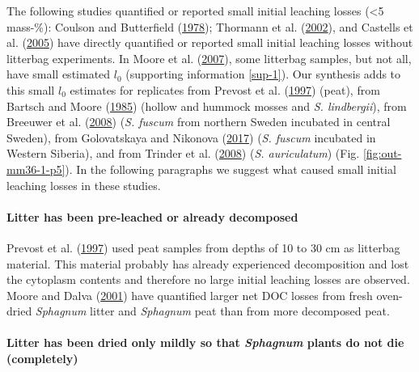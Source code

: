\documentclass[
  12pt,
]{article}
\begin{document}
The following studies quantified or reported small initial leaching losses (\textless5 mass-\%): Coulson and Butterfield (\protect\hyperlink{ref-Coulson.1978}{1978}); Thormann et al. (\protect\hyperlink{ref-Thormann.2002}{2002}), and Castells et al. (\protect\hyperlink{ref-Castells.2005}{2005}) have directly quantified or reported small initial leaching losses without litterbag experiments. In Moore et al. (\protect\hyperlink{ref-Moore.2007}{2007}), some litterbag samples, but not all, have small estimated \(l_0\) (supporting information \ref{sup-1}). Our synthesis adds to this small \(l_0\) estimates for replicates from Prevost et al. (\protect\hyperlink{ref-Prevost.1997}{1997}) (peat), from Bartsch and Moore (\protect\hyperlink{ref-Bartsch.1985}{1985}) (hollow and hummock mosses and \emph{S. lindbergii}), from Breeuwer et al. (\protect\hyperlink{ref-Breeuwer.2008}{2008}) (\emph{S. fuscum} from northern Sweden incubated in central Sweden), from Golovatskaya and Nikonova (\protect\hyperlink{ref-Golovatskaya.2017}{2017}) (\emph{S. fuscum} incubated in Western Siberia), and from Trinder et al. (\protect\hyperlink{ref-Trinder.2008}{2008}) (\emph{S. auriculatum}) (Fig. \ref{fig:out-mm36-1-p5}). In the following paragraphs we suggest what caused small initial leaching losses in these studies.

\hypertarget{litter-has-been-pre-leached-or-already-decomposed}{%
\paragraph*{Litter has been pre-leached or already decomposed}\label{litter-has-been-pre-leached-or-already-decomposed}}

Prevost et al. (\protect\hyperlink{ref-Prevost.1997}{1997}) used peat samples from depths of 10 to 30 cm as litterbag material. This material probably has already experienced decomposition and lost the cytoplasm contents and therefore no large initial leaching losses are observed. Moore and Dalva (\protect\hyperlink{ref-Moore.2001}{2001}) have quantified larger net DOC losses from fresh oven-dried \emph{Sphagnum} litter and \emph{Sphagnum} peat than from more decomposed peat.

\hypertarget{litter-has-been-dried-only-mildly-so-that-sphagnum-plants-do-not-die-completely}{%
\paragraph*{\texorpdfstring{Litter has been dried only mildly so that \emph{Sphagnum} plants do not die (completely)}{Litter has been dried only mildly so that Sphagnum plants do not die (completely)}}\label{litter-has-been-dried-only-mildly-so-that-sphagnum-plants-do-not-die-completely}}
\end{document}
